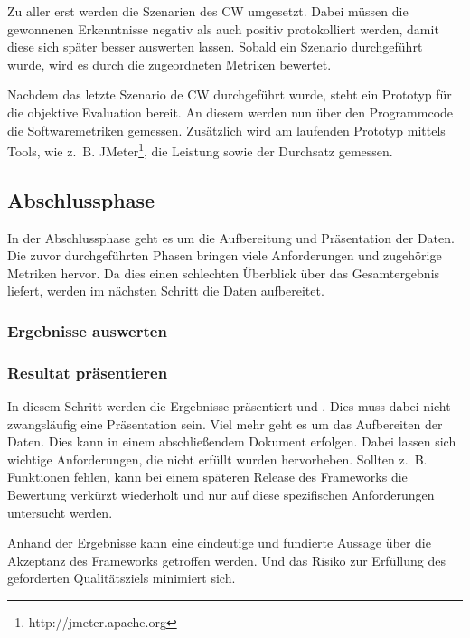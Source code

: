 Zu aller erst werden die Szenarien des \ac{CW} umgesetzt. Dabei müssen die gewonnenen Erkenntnisse negativ als auch positiv protokolliert werden, damit diese sich später besser auswerten lassen. Sobald ein Szenario durchgeführt wurde, wird es durch die zugeordneten Metriken bewertet.

Nachdem das letzte Szenario de \ac{CW} durchgeführt wurde, steht ein Prototyp für die objektive Evaluation bereit. An diesem werden nun über den Programmcode die Softwaremetriken gemessen. Zusätzlich wird am laufenden Prototyp mittels Tools, wie z.~B. JMeter\footnote{http://jmeter.apache.org}, die Leistung sowie der Durchsatz gemessen.

\subsection{Abschlussphase}


In der Abschlussphase geht es um die Aufbereitung und Präsentation der Daten. Die zuvor durchgeführten Phasen bringen viele Anforderungen und zugehörige Metriken hervor. Da dies einen schlechten Überblick über das Gesamtergebnis liefert, werden im nächsten Schritt die Daten aufbereitet.

\subsubsection{Ergebnisse auswerten}



\subsubsection{Resultat präsentieren}
In diesem Schritt werden die Ergebnisse präsentiert und . Dies muss dabei nicht zwangsläufig eine Präsentation sein. Viel mehr geht es um das Aufbereiten der Daten. Dies kann in einem abschließendem Dokument erfolgen. Dabei lassen sich wichtige Anforderungen, die nicht erfüllt wurden hervorheben. Sollten z.~B. Funktionen fehlen, kann bei einem späteren Release des Frameworks die Bewertung verkürzt wiederholt und nur auf diese spezifischen Anforderungen untersucht werden.

Anhand der Ergebnisse kann eine eindeutige und fundierte Aussage über die Akzeptanz des Frameworks getroffen werden. Und das Risiko zur Erfüllung des geforderten Qualitätsziels minimiert sich.

\pagebreak












